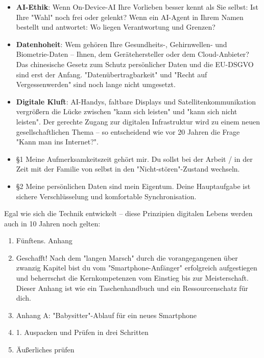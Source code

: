 \begin{itemize}
  \item \textbf{AI-Ethik}: Wenn On-Device-AI Ihre Vorlieben besser kennt als Sie selbst: Ist Ihre "Wahl" noch frei oder gelenkt? Wenn ein AI-Agent in Ihrem Namen bestellt und antwortet: Wo liegen Verantwortung und Grenzen?
  \item \textbf{Datenhoheit}: Wem gehören Ihre Gesundheits-, Gehirnwellen- und Biometrie-Daten – Ihnen, dem Gerätehersteller oder dem Cloud-Anbieter? Das chinesische Gesetz zum Schutz persönlicher Daten und die EU-DSGVO sind erst der Anfang. "Datenübertragbarkeit" und "Recht auf Vergessenwerden" sind noch lange nicht umgesetzt.
  \item \textbf{Digitale Kluft}: AI-Handys, faltbare Displays und Satellitenkommunikation vergrößern die Lücke zwischen "kann sich leisten" und "kann sich nicht leisten". Der gerechte Zugang zur digitalen Infrastruktur wird zu einem neuen gesellschaftlichen Thema – so entscheidend wie vor 20 Jahren die Frage "Kann man ins Internet?".
  \item §1 Meine Aufmerksamkeitszeit gehört mir. Du sollst bei der Arbeit / in der Zeit mit der Familie von selbst in den "Nicht-stören"-Zustand wechseln.
  \item §2 Meine persönlichen Daten sind mein Eigentum. Deine Hauptaufgabe ist sichere Verschlüsselung und komfortable Synchronisation.
\end{itemize}


Egal wie sich die Technik entwickelt – diese Prinzipien digitalen Lebens werden auch in 10 Jahren noch gelten:

\begin{enumerate}
  \item Fünftens. Anhang
  \item Geschafft! Nach dem "langen Marsch" durch die vorangegangenen über zwanzig Kapitel bist du vom "Smartphone-Anfänger" erfolgreich aufgestiegen und beherrschst die Kernkompetenzen vom Einstieg bis zur Meisterschaft. Dieser Anhang ist wie ein Taschenhandbuch und ein Ressourcenschatz für dich.
  \item Anhang A: "Babysitter"-Ablauf für ein neues Smartphone
  \item 1. Auspacken und Prüfen in drei Schritten
  \item Äußerliches prüfen
\end{enumerate}

